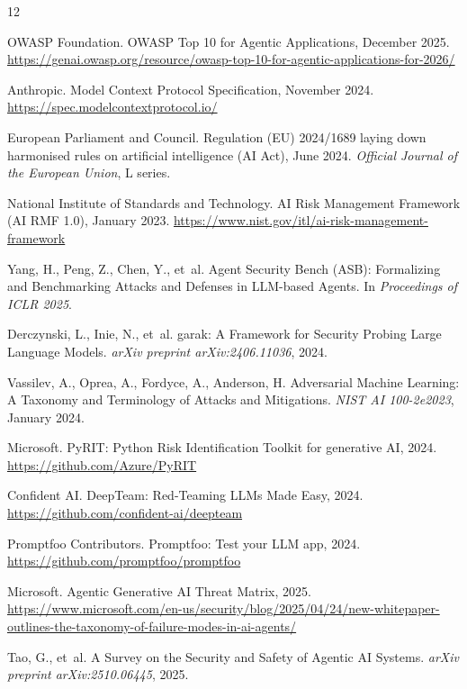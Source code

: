 \documentclass{article}
\begin{document}
\begin{thebibliography}{12}

OWASP Foundation.
\newblock OWASP Top 10 for Agentic Applications, December 2025.
\newblock \url{https://genai.owasp.org/resource/owasp-top-10-for-agentic-applications-for-2026/}

Anthropic.
\newblock Model Context Protocol Specification, November 2024.
\newblock \url{https://spec.modelcontextprotocol.io/}

European Parliament and Council.
\newblock Regulation (EU) 2024/1689 laying down harmonised rules on
  artificial intelligence (AI Act), June 2024.
\newblock \emph{Official Journal of the European Union}, L series.

National Institute of Standards and Technology.
\newblock AI Risk Management Framework (AI RMF 1.0), January 2023.
\newblock \url{https://www.nist.gov/itl/ai-risk-management-framework}

Yang, H., Peng, Z., Chen, Y., et~al.
\newblock Agent Security Bench (ASB): Formalizing and Benchmarking Attacks
  and Defenses in LLM-based Agents.
\newblock In \emph{Proceedings of ICLR 2025}.

Derczynski, L., Inie, N., et~al.
\newblock garak: A Framework for Security Probing Large Language Models.
\newblock \emph{arXiv preprint arXiv:2406.11036}, 2024.

Vassilev, A., Oprea, A., Fordyce, A., Anderson, H.
\newblock Adversarial Machine Learning: A Taxonomy and Terminology of
  Attacks and Mitigations.
\newblock \emph{NIST AI 100-2e2023}, January 2024.

Microsoft.
\newblock PyRIT: Python Risk Identification Toolkit for generative AI, 2024.
\newblock \url{https://github.com/Azure/PyRIT}

Confident AI.
\newblock DeepTeam: Red-Teaming LLMs Made Easy, 2024.
\newblock \url{https://github.com/confident-ai/deepteam}

Promptfoo Contributors.
\newblock Promptfoo: Test your LLM app, 2024.
\newblock \url{https://github.com/promptfoo/promptfoo}

Microsoft.
\newblock Agentic Generative AI Threat Matrix, 2025.
\newblock \url{https://www.microsoft.com/en-us/security/blog/2025/04/24/new-whitepaper-outlines-the-taxonomy-of-failure-modes-in-ai-agents/}

Tao, G., et~al.
\newblock A Survey on the Security and Safety of Agentic AI Systems.
\newblock \emph{arXiv preprint arXiv:2510.06445}, 2025.

\end{thebibliography}
\end{document}
